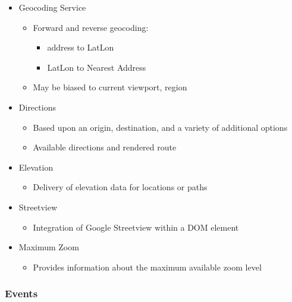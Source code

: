 \documentclass[]{article}
\begin{document}
\begin{itemize}
\itemsep1pt\parskip0pt
\item
  Geocoding Service

  \begin{itemize}
  \itemsep1pt\parskip0pt
  \item
    Forward and reverse geocoding:

    \begin{itemize}
    \itemsep1pt\parskip0pt
    \item
      address to LatLon
    \item
      LatLon to Nearest Address
    \end{itemize}
  \item
    May be biased to current viewport, region
  \end{itemize}
\item
  Directions

  \begin{itemize}
  \itemsep1pt\parskip0pt
  \item
    Based upon an origin, destination, and a variety of additional
    options
  \item
    Available directions and rendered route
  \end{itemize}
\item
  Elevation

  \begin{itemize}
  \itemsep1pt\parskip0pt
  \item
    Delivery of elevation data for locations or paths
  \end{itemize}
\item
  Streetview

  \begin{itemize}
  \itemsep1pt\parskip0pt
  \item
    Integration of Google Streetview within a DOM element
  \end{itemize}
\item
  Maximum Zoom

  \begin{itemize}
  \itemsep1pt\parskip0pt
  \item
    Provides information about the maximum available zoom level
  \end{itemize}
\end{itemize}

\subsubsection{Events}\label{events}
\end{document}
